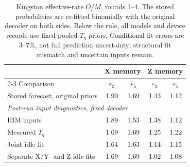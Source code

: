 \documentclass[aps,pra,reprint,nofootinbib,longbibliography,floatfix,showkeys]{revtex4-2}
\newcommand{\eps}{\varepsilon}
\begin{document}
\begin{table}[tb]
\caption{Kingston effective-rate $O/M$, rounds 1--4. The stored probabilities are re-fitted binomially with the original decoder on both sides.
Below the rule, all models and device records use fixed pooled-$T_q$ priors.
Conditional fit errors are 3--7\%, not full prediction uncertainty; structural fit mismatch and uncertain inputs remain.}
\label{tab:kingston}
\footnotesize
\setlength{\tabcolsep}{3pt}
\begin{ruledtabular}
\begin{tabular}{@{}p{}cccc@{}}
 & \multicolumn{2}{c}{X memory} & \multicolumn{2}{c}{Z memory} \\
\cline{2-3}\cline{4-5}
Comparison & $\eps_3$ & $\eps_5$ & $\eps_3$ & $\eps_5$ \\
\hline
Stored forecast, original priors & 1.90 & 1.69 & 1.43 & 1.12 \\
\hline
\multicolumn{5}{l}{\emph{Post-run input diagnostics, fixed decoder}} \\
IBM inputs & 1.89 & 1.53 & 1.38 & 1.12 \\
Measured $T_q$ & 1.69 & 1.69 & 1.25 & 1.22 \\
Joint idle fit & 1.64 & 1.63 & 1.14 & 1.15 \\
Separate X/Y- and Z-idle fits & 1.69 & 1.69 & 1.02 & 1.08 \\
\end{tabular}
\end{ruledtabular}
\end{table}
\end{document}
